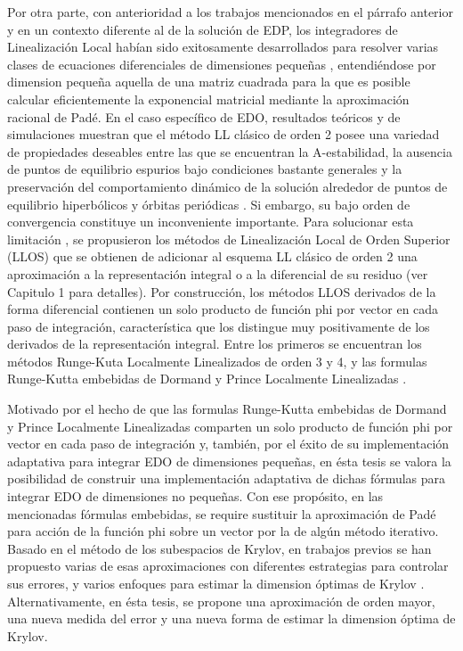 Por otra parte, con anterioridad a los trabajos mencionados en el párrafo anterior y en un contexto diferente al de la solución de EDP, los integradores de Linealización Local habían sido exitosamente desarrollados para resolver varias clases de ecuaciones diferenciales de dimensiones pequeñas \cite{jimenez2020}, entendiéndose por dimension pequeña aquella de una matriz cuadrada para la que es posible calcular eficientemente la exponencial matricial mediante la aproximación racional de Padé. En el caso específico de EDO, resultados teóricos y de simulaciones muestran que el método LL clásico de orden 2  \cite{pope1963exponential} posee una variedad de propiedades deseables entre las que se encuentran la A-estabilidad, la ausencia de puntos de equilibrio espurios bajo condiciones bastante generales y la preservación del comportamiento dinámico de la solución alrededor de puntos de equilibrio hiperbólicos y órbitas periódicas \cite{Jimenez02AMC}. Si embargo, su bajo orden de convergencia constituye un inconveniente importante. Para solucionar esta limitación \cite{delaCruz06,delaCruz07,Jimenez13}, se propusieron los métodos de Linealización Local de Orden Superior (LLOS) que se obtienen de adicionar al esquema LL clásico de orden 2 una aproximación a la representación integral o a la diferencial de su residuo (ver Capitulo 1 para detalles). Por construcción, los métodos LLOS derivados de la forma diferencial contienen un solo  producto de función phi por vector en cada paso de integración, característica que los distingue muy positivamente de los derivados de la representación integral. Entre los primeros se encuentran los métodos Runge-Kuta Localmente Linealizados de orden 3 y 4, y las formulas Runge-Kutta embebidas de Dormand y Prince Localmente Linealizadas \cite{delaCruz06,Jimenez13,Jimenez14AMC}.

Motivado por el hecho de que las formulas Runge-Kutta embebidas de Dormand y Prince Localmente Linealizadas comparten un solo producto de función phi por vector en cada paso de integración y, también, por el éxito de su implementación adaptativa para integrar EDO de dimensiones pequeñas, en ésta tesis se valora la posibilidad de construir una implementación adaptativa de dichas fórmulas para integrar EDO de dimensiones no pequeñas. Con ese propósito, en las mencionadas fórmulas embebidas, se require sustituir la aproximación de Padé para acción de la función phi sobre un vector por la de algún método iterativo. Basado en el método de los subespacios de Krylov, en trabajos previos se han propuesto varias de esas aproximaciones con diferentes estrategias para controlar sus errores, y varios enfoques para estimar la dimension óptimas de Krylov \cite{hochbruck1998exponential,sidje1998expokit,niesen2012algorithm,gaudreault2018kiops}. Alternativamente, en ésta tesis, se propone una aproximación de orden mayor, una nueva medida del error y una nueva forma de estimar la dimension óptima de Krylov.

